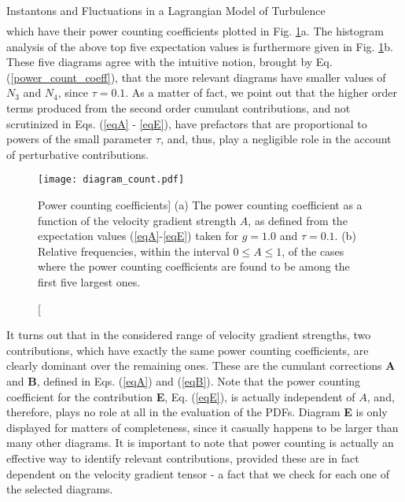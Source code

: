 \begin{chapter}{Instantons and Fluctuations in a Lagrangian Model of Turbulence}
\begin{align}
\end{align}
which have their power counting coefficients plotted in Fig. \ref{fig:powers-scaling}a. The histogram analysis of the above top five expectation values is furthermore given in Fig. \ref{fig:powers-scaling}b.
These five diagrams agree with the intuitive notion, brought by
Eq. (\ref{power_count_coeff}), that the more relevant diagrams have smaller values
of $N_3$ and $N_4$, since $\tau = 0.1$. As a matter of fact, we point out that the higher order terms produced from the second order cumulant contributions, and not scrutinized in Eqs. (\ref{eqA} - \ref{eqE}), have prefactors that are proportional to powers of the small parameter $\tau$, and, thus, play a negligible role in the account of perturbative contributions.

\begin{figure}[ht]
 \centering
 \texttt{[image: diagram\_count.pdf]}
 \caption
 [Power counting coefficients]
 {(a)  The power counting coefficient as a function of the velocity gradient strength $A$, as defined from the expectation values (\ref{eqA}-\ref{eqE}) taken for $g=1.0$ and $\tau=0.1$. (b) Relative frequencies, within the interval $0 \leq A \leq 1$, of the cases where the power counting coefficients are found to be among the first five largest ones.}
 \label{fig:powers-scaling}
\end{figure}

It turns out that in the considered range of velocity gradient strengths, two contributions, which have exactly the same power counting coefficients,
are clearly dominant over the remaining ones. These are the cumulant corrections {\hbox{\textbf{A}}} and {\hbox{\textbf{B}}}, defined in Eqs. (\ref{eqA}) and (\ref{eqB}). 
Note that the power counting coefficient for the contribution {\hbox{\textbf{E}}}, Eq. (\ref{eqE}), is actually independent of $A$, and, therefore, plays 
no role at all in the evaluation of the PDFs.
Diagram \textbf{E} is only displayed for matters of completeness,
since it casually happens to be larger than many other diagrams. It is important to note that power counting is actually an effective way to identify relevant contributions, provided these are in fact dependent on the velocity gradient tensor - a fact that we check for each one of the selected diagrams.


\end{chapter}
